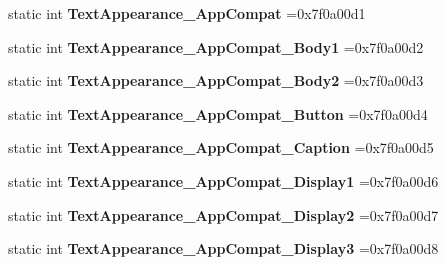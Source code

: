 \begin{DoxyCompactItemize}
\item 
\mbox{\label{classandroid_1_1support_1_1design_1_1R_1_1style_a1efee3fecf9150d4e97f12b17c6cacea}} 
static int {\bfseries Text\+Appearance\+\_\+\+App\+Compat} =0x7f0a00d1
\item 
\mbox{\label{classandroid_1_1support_1_1design_1_1R_1_1style_a357a57d6382e93d7e1fa557c33516df4}} 
static int {\bfseries Text\+Appearance\+\_\+\+App\+Compat\+\_\+\+Body1} =0x7f0a00d2
\item 
\mbox{\label{classandroid_1_1support_1_1design_1_1R_1_1style_ac9d92eaa6146a29e566ebe4a5bd8f73b}} 
static int {\bfseries Text\+Appearance\+\_\+\+App\+Compat\+\_\+\+Body2} =0x7f0a00d3
\item 
\mbox{\label{classandroid_1_1support_1_1design_1_1R_1_1style_a54e8c4b3c5dc18bcc8c73242f8f822b8}} 
static int {\bfseries Text\+Appearance\+\_\+\+App\+Compat\+\_\+\+Button} =0x7f0a00d4
\item 
\mbox{\label{classandroid_1_1support_1_1design_1_1R_1_1style_a45af624175e504230480703677f09601}} 
static int {\bfseries Text\+Appearance\+\_\+\+App\+Compat\+\_\+\+Caption} =0x7f0a00d5
\item 
\mbox{\label{classandroid_1_1support_1_1design_1_1R_1_1style_a7346e781474500e23478c7835927b370}} 
static int {\bfseries Text\+Appearance\+\_\+\+App\+Compat\+\_\+\+Display1} =0x7f0a00d6
\item 
\mbox{\label{classandroid_1_1support_1_1design_1_1R_1_1style_a8eec3b7d21f8f4f71f3204497d121bac}} 
static int {\bfseries Text\+Appearance\+\_\+\+App\+Compat\+\_\+\+Display2} =0x7f0a00d7
\item 
\mbox{\label{classandroid_1_1support_1_1design_1_1R_1_1style_af03663bd632638932c1487e7427e8a09}} 
static int {\bfseries Text\+Appearance\+\_\+\+App\+Compat\+\_\+\+Display3} =0x7f0a00d8
\item 

\end{DoxyCompactItemize}
